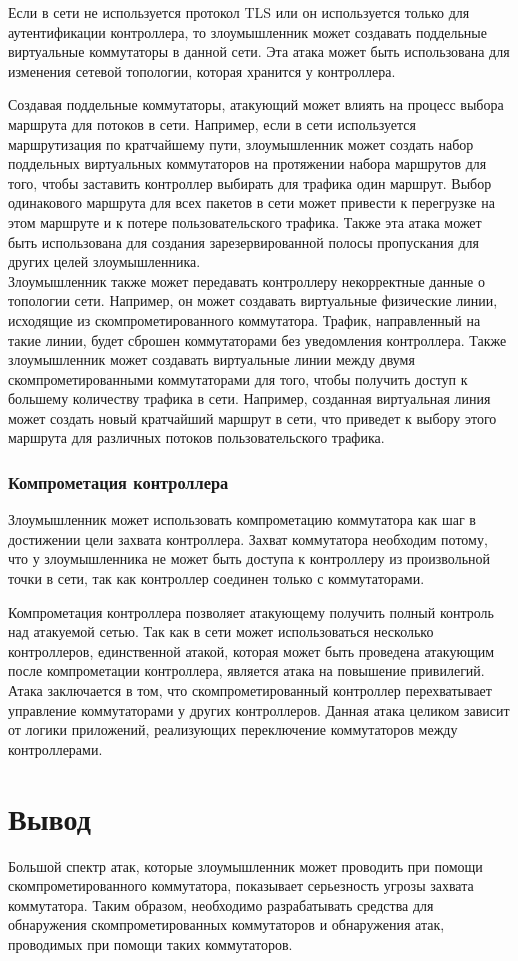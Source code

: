 \documentclass[../thesis.tex]{subfiles}
\begin{document}
Если в сети не используется протокол TLS или он используется только для аутентификации контроллера, то злоумышленник может создавать поддельные виртуальные коммутаторы в данной сети.
Эта атака может быть использована для изменения сетевой топологии, которая хранится у контроллера.

Создавая поддельные коммутаторы, атакующий может влиять на процесс выбора маршрута для потоков в сети.
Например, если в сети используется маршрутизация по кратчайшему пути, злоумышленник может создать набор поддельных виртуальных коммутаторов на протяжении набора маршрутов для того, чтобы заставить контроллер выбирать для трафика один маршрут.
Выбор одинакового маршрута для всех пакетов в сети может привести к перегрузке на этом маршруте и к потере пользовательского трафика.
Также эта атака может быть использована для создания зарезервированной полосы пропускания для других целей злоумышленника.
\\

Злоумышленник также может передавать контроллеру некорректные данные о топологии сети.
Например, он может создавать виртуальные физические линии, исходящие из скомпрометированного коммутатора.
Трафик, направленный на такие линии, будет сброшен коммутаторами без уведомления контроллера.
Также злоумышленник может создавать виртуальные линии между двумя скомпрометированными коммутаторами для того, чтобы получить доступ к большему количеству трафика в сети.
Например, созданная виртуальная линия может создать новый кратчайший маршрут в сети, что приведет к выбору этого маршрута для различных потоков пользовательского трафика.

\subsubsection{Компрометация контроллера}

Злоумышленник может использовать компрометацию коммутатора как шаг в достижении цели захвата контроллера.
Захват коммутатора необходим потому, что у злоумышленника не может быть доступа к контроллеру из произвольной точки в сети, так как контроллер соединен только с коммутаторами.

Компрометация контроллера позволяет атакующему получить полный контроль над атакуемой сетью.
Так как в сети может использоваться несколько контроллеров, единственной атакой, которая может быть проведена атакующим после компрометации контроллера, является атака на повышение привилегий.
Атака заключается в том, что скомпрометированный контроллер перехватывает управление коммутаторами у других контроллеров.
Данная атака целиком зависит от логики приложений, реализующих переключение коммутаторов между контроллерами.

\section{Вывод}

Большой спектр атак, которые злоумышленник может проводить при помощи скомпрометированного коммутатора, показывает серьезность угрозы захвата коммутатора.
Таким образом, необходимо разрабатывать средства для обнаружения скомпрометированных коммутаторов и обнаружения атак, проводимых при помощи таких коммутаторов.
\end{document}
